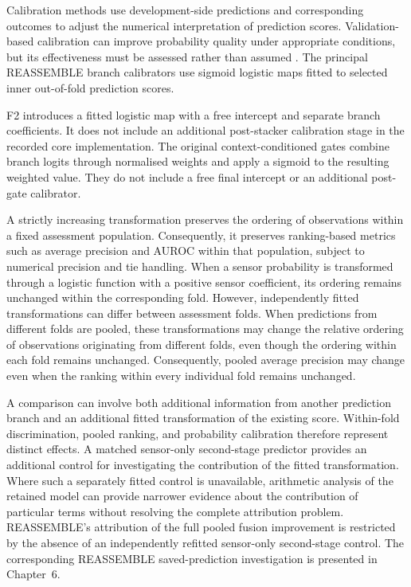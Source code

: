 Calibration methods use development-side predictions and corresponding outcomes to adjust the numerical interpretation of prediction scores. Validation-based calibration can improve probability quality under appropriate conditions, but its effectiveness must be assessed rather than assumed \parencite{Guo2017Calibration}. The principal REASSEMBLE branch calibrators use sigmoid logistic maps fitted to selected inner out-of-fold prediction scores.

F2 introduces a fitted logistic map with a free intercept and separate branch coefficients. It does not include an additional post-stacker calibration stage in the recorded core implementation. The original context-conditioned gates combine branch logits through normalised weights and apply a sigmoid to the resulting weighted value. They do not include a free final intercept or an additional post-gate calibrator.

A strictly increasing transformation preserves the ordering of observations within a fixed assessment population. Consequently, it preserves ranking-based metrics such as average precision and AUROC within that population, subject to numerical precision and tie handling. When a sensor probability is transformed through a logistic function with a positive sensor coefficient, its ordering remains unchanged within the corresponding fold. However, independently fitted transformations can differ between assessment folds. When predictions from different folds are pooled, these transformations may change the relative ordering of observations originating from different folds, even though the ordering within each fold remains unchanged. Consequently, pooled average precision may change even when the ranking within every individual fold remains unchanged.

A comparison can involve both additional information from another prediction branch and an additional fitted transformation of the existing score. Within-fold discrimination, pooled ranking, and probability calibration therefore represent distinct effects. A matched sensor-only second-stage predictor provides an additional control for investigating the contribution of the fitted transformation. Where such a separately fitted control is unavailable, arithmetic analysis of the retained model can provide narrower evidence about the contribution of particular terms without resolving the complete attribution problem. REASSEMBLE’s attribution of the full pooled fusion improvement is restricted by the absence of an independently refitted sensor-only second-stage control. The corresponding REASSEMBLE saved-prediction investigation is presented in Chapter~6.

